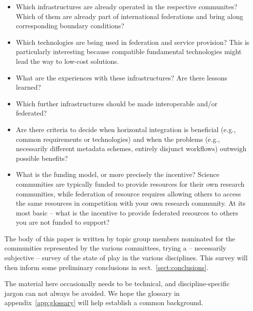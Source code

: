 \documentclass{article}
\begin{document}
\begin{itemize}
\item Which infrastructures are already operated in the
respective communites?  Which of them are already part of international
federations and bring along corresponding boundary conditions?

\item Which technologies are being used in federation and service
provision?  This is particularly interesting because compatible
fundamental technologies might lead the way to low-cost solutions.

\item What are the experiences with these infrastructures?  Are there
lessons learned?

\item Which further infrastructures should be made interoperable and/or
federated?

\item Are there criteria to decide when horizontal integration is
beneficial (e.g., common requirements or technologies) and when the
problems (e.g., necessarily different metadata schemes, entirely
disjunct workflows) outweigh possible benefits?

\item What is the funding model, or more precisely the incentive?
Science communities are typically funded to provide resources for their
own research communities, while federation of resource requires allowing
others to access the same resources in competition with your own
research community. At its most basic -- what is the incentive to
provide federated resources to others you are not funded to support?
\end{itemize}

The body of this paper is written by topic group members nominated for
the communities represented by the various committees, trying a --
necessarily subjective -- survey of the state of play in the various
disciplines.  This survey will then inform some preliminary conclusions
in sect.~\ref{sect:conclusions}.

The material here occasionally needs to be technical, and
discipline-specific jargon can not always be avoided.  We hope the
glossary in appendix~\ref{app:glossary} will help establish a common
background.



















\appendix


\end{document}
